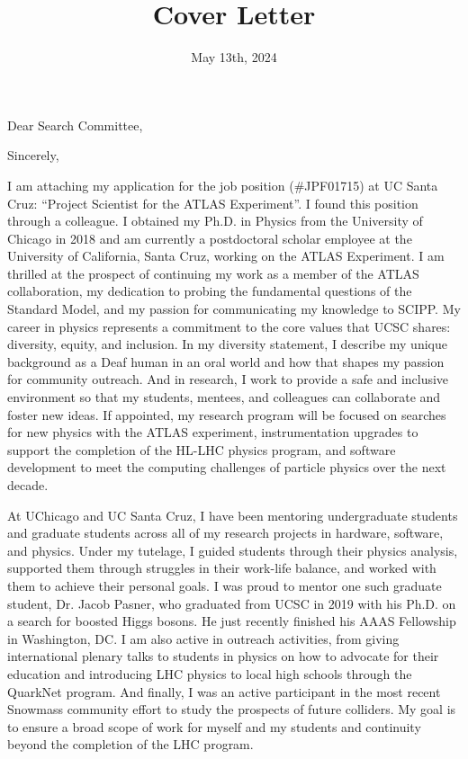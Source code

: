 \documentclass[10pt,letterpaper,sans]{moderncv} %
\title{Cover Letter}
\begin{document}
\date{May 13th, 2024}
\opening{Dear Search Committee,}
\closing{Sincerely,}

\makelettertitle
\vspace*{-1em}

I am attaching my application for the job position (\#JPF01715) at UC Santa Cruz: ``Project Scientist for the ATLAS Experiment''. I found this position through a colleague. I obtained my Ph.D. in Physics from the University of Chicago in 2018 and am currently a postdoctoral scholar employee at the University of California, Santa Cruz, working on the ATLAS Experiment. I am thrilled at the prospect of continuing my work as a member of the ATLAS collaboration, my dedication to probing the fundamental questions of the Standard Model, and my passion for communicating my knowledge to SCIPP. My career in physics represents a commitment to the core values that UCSC shares: diversity, equity, and inclusion. In my diversity statement, I describe my unique background as a Deaf human in an oral world and how that shapes my passion for community outreach. And in research, I work to provide a safe and inclusive environment so that my students, mentees, and colleagues can collaborate and foster new ideas. If appointed, my research program will be focused on searches for new physics with the ATLAS experiment, instrumentation upgrades to support the completion of the HL-LHC physics program, and software development to meet the computing challenges of particle physics over the next decade.

At UChicago and UC Santa Cruz, I have been mentoring undergraduate students and graduate students across all of my research projects in hardware, software, and physics. Under my tutelage, I guided students through their physics analysis, supported them through struggles in their work-life balance, and worked with them to achieve their personal goals. I was proud to mentor one such graduate student, Dr. Jacob Pasner, who graduated from UCSC in 2019 with his Ph.D. on a search for boosted Higgs bosons. He just recently finished his AAAS Fellowship in Washington, DC. I am also active in outreach activities, from giving international plenary talks to students in physics on how to advocate for their education and introducing LHC physics to local high schools through the QuarkNet program. And finally, I was an active participant in the most recent Snowmass community effort to study the prospects of future colliders. My goal is to ensure a broad scope of work for myself and my students and continuity beyond the completion of the LHC program.
\end{document}
